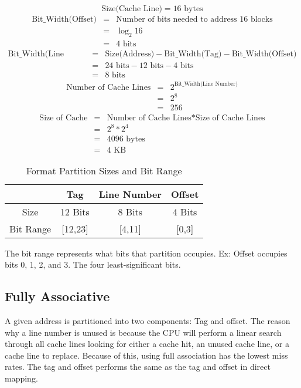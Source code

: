 \documentclass[11pt]{article}
\begin{document}
\[
\text{Size(Cache Line)} = 16 \text{ bytes}
\]
\begin{eqnarray*}
	\text{Bit\_Width(Offset)} &=& \text{Number of bits needed to address 16 blocks}\\
		&=& \log_2 16\\
		&=& 4 \text{ bits}
\end{eqnarray*}
\begin{eqnarray*}
\text{Bit\_Width(Line Number)} &=& \text{Size(Address)} - \text{Bit\_Width(Tag)} - \text{Bit\_Width(Offset)}\\
	&=& 24 \text{ bits} - 12 \text{ bits} - 4 \text{ bits}\\
	&=& 8 \text{ bits}
\end{eqnarray*}
\begin{eqnarray*}
	\text{Number of Cache Lines} &=& 2^\text{Bit\_Width(Line Number)}\\
		&=& 2^8\\
		&=& 256
\end{eqnarray*}
\begin{eqnarray*}
	\text{Size of Cache} &=& \text{Number of Cache Lines} * \text{Size of Cache Lines}\\
		&=& 2^8 * 2^4\\
		&=& 4096 \text{ bytes}\\
		&=& 4 \text{ KB}
\end{eqnarray*}

\begin{table}[H]
	\centering
	\caption*{Format Partition Sizes and Bit Range}
	\begin{tabular}{| c | c | c | c |}
		\hline
					&	Tag		&	Line Number		&	Offset\\
		\hline
		Size		&	12 Bits	&	8 Bits			&	4 Bits\\
		\hline
		Bit Range	&	[12,23]	&	[4,11]	&	[0,3]\\
		\hline
	\end{tabular}
\end{table}

\noindent The bit range represents what bits that partition occupies. Ex: Offset occupies bits 0, 1, 2, and 3. The four least-significant bits.

\subsection{Fully Associative}

A given address is partitioned into two components: Tag and offset. The reason why a line number is unused is because the CPU will perform a linear search through all cache lines looking for either a cache hit, an unused cache line, or a cache line to replace. Because of this, using full association has the lowest miss rates. The tag and offset performs the same as the tag and offset in direct mapping.
\end{document}
